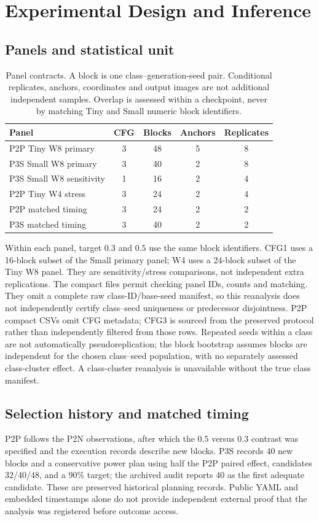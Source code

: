 \documentclass[11pt,a4paper]{article}
\theoremstyle{plain}
\theoremstyle{definition}
\theoremstyle{remark}
\begin{document}
\section{Experimental Design and Inference}
\label{sec:design}
\subsection{Panels and statistical unit}
\begin{table}[tb]
\centering\small
\caption{Panel contracts. A block is one class--generation-seed pair. Conditional
replicates, anchors, coordinates and output images are not additional independent
samples. Overlap is assessed within a checkpoint, never by matching Tiny and
Small numeric block identifiers.}
\label{tab:panels}
\begin{tabular}{@{}p{}cccc@{}}\toprule
Panel & CFG & Blocks & Anchors & Replicates\\\midrule
P2P Tiny W8 primary & 3 & 48 & 5 & 8\\
P3S Small W8 primary & 3 & 40 & 2 & 8\\
P3S Small W8 sensitivity & 1 & 16 & 2 & 4\\
P2P Tiny W4 stress & 3 & 24 & 2 & 4\\
P2P matched timing & 3 & 24 & 2 & 2\\
P3S matched timing & 3 & 40 & 2 & 2\\\bottomrule
\end{tabular}
\end{table}
Within each panel, target $0.3$ and $0.5$ use the same block identifiers.
CFG1 uses a 16-block subset of the Small primary panel; W4 uses a 24-block
subset of the Tiny W8 panel. They are sensitivity/stress comparisons, not
independent extra replications. The compact files permit checking panel IDs,
counts and matching. They omit a complete raw class-ID/base-seed manifest, so
this reanalysis does not independently certify class--seed uniqueness or
predecessor disjointness. P2P compact CSVs omit CFG metadata; CFG3 is sourced
from the preserved protocol rather than independently filtered from those rows. Repeated seeds within a class are not automatically
pseudoreplication; the block bootstrap assumes blocks are independent for the
chosen class--seed population, with no separately assessed class-cluster effect.
A class-cluster reanalysis is unavailable without the true class manifest.

\subsection{Selection history and matched timing}
P2P follows the P2N observations, after which the $0.5$ versus $0.3$ contrast was
specified and the execution records describe new blocks. P3S records 40 new
blocks and a conservative power plan using half the P2P paired effect, candidates
32/40/48, and a 90\% target; the archived audit reports 40 as the first adequate
candidate. These are preserved historical planning records. Public YAML and
embedded timestamps alone do not provide independent external proof that the
analysis was registered before outcome access.
\end{document}
